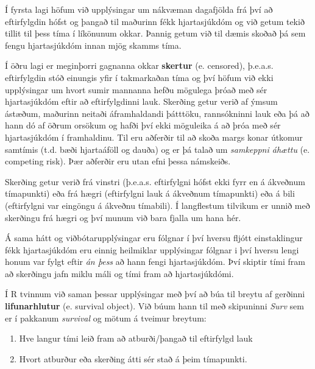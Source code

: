 \documentclass[
]{book}
\newenvironment{Shaded}{\begin{snugshade}}{\end{snugshade}}
\newcommand{\KeywordTok}[1]{\textcolor[rgb]{0.13,0.29,0.53}{\textbf{#1}}}
\newcommand{\NormalTok}[1]{#1}
\newcommand{\OperatorTok}[1]{\textcolor[rgb]{0.81,0.36,0.00}{\textbf{#1}}}
\newcommand{\StringTok}[1]{\textcolor[rgb]{0.31,0.60,0.02}{#1}}
\providecommand{\tightlist}{%
  \setlength{\itemsep}{0pt}\setlength{\parskip}{0pt}}
\begin{document}
Í fyrsta lagi höfum við upplýsingar um nákvæman dagafjölda frá því að eftirfylgdin hófst og þangað til maðurinn fékk hjartasjúkdóm og við getum tekið tillit til þess tíma í líkönunum okkar. Þannig getum við til dæmis skoðað þá sem fengu hjartasjúkdóm innan mjög skamms tíma.

Í öðru lagi er meginþorri gagnanna okkar \textbf{skertur} (e. censored), þ.e.a.s. eftirfylgdin stóð einungis yfir í takmarkaðan tíma og því höfum við ekki upplýsingar um hvort sumir mannanna hefðu mögulega þróað með sér hjartasjúkdóm eftir að eftirfylgdinni lauk. Skerðing getur verið af ýmsum ástæðum, maðurinn neitaði áframhaldandi þátttöku, rannsókninni lauk eða þá að hann dó af öðrum orsökum og hafði því ekki möguleika á að þróa með sér hjartasjúkdóm í framhaldinu. Til eru aðferðir til að skoða margs konar útkomur samtímis (t.d. bæði hjartaáföll og dauða) og er þá talað um \emph{samkeppni áhættu} (e. competing risk). Þær aðferðir eru utan efni þessa námskeiðs.

Skerðing getur verið frá vinstri (þ.e.a.s. eftirfylgni hófst ekki fyrr en á ákveðnum tímapunkti) eða frá hægri (eftirfylgni lauk á ákveðnum tímapunkti) eða á bili (eftirfylgni var eingöngu á ákveðnu tímabili). Í langflestum tilvikum er unnið með skerðingu frá hægri og því munum við bara fjalla um hana hér.

Á sama hátt og viðbótarupplýsingar eru fólgnar í því hversu fljótt einstaklingur fékk hjartasjúkdóm eru einnig heilmiklar upplýsingar fólgnar i því hversu lengi honum var fylgt eftir \emph{án þess} að hann fengi hjartasjúkdóm. Því skiptir tími fram að skerðingu jafn miklu máli og tími fram að hjartasjúkdómi.

Í R tvinnum við saman þessar upplýsingar með því að búa til breytu af gerðinni \textbf{lifunarhlutur} (e. survival object). Við búum hann til með skipuninni \emph{Surv} sem er í pakkanum \emph{survival} og mötum á tveimur breytum:

\begin{enumerate}
\def\labelenumi{\arabic{enumi}.}
\tightlist
\item
  Hve langur tími leið fram að atburði/þangað til eftirfylgd lauk
\item
  Hvort atburður eða skerðing átti sér stað á þeim tímapunkti.
\end{enumerate}

\begin{Shaded}
\end{Shaded}
\end{document}
